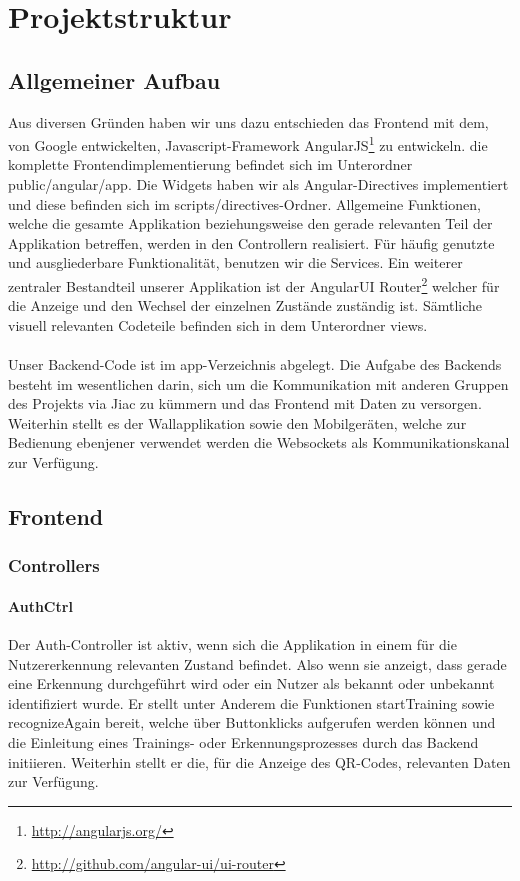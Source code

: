 \documentclass[10pt,a4paper]{report}
\newcommand{\code}[1]{{\fontfamily{cmvtt}\selectfont #1}}
\begin{document}
	\section{Projektstruktur}
		\subsection{Allgemeiner Aufbau}
			Aus diversen Gründen haben wir uns dazu entschieden das Frontend mit dem, von Google entwickelten, Javascript-Framework AngularJS\footnote{\href{http://angularjs.org/}{http://angularjs.org/}} zu entwickeln. die komplette Frontendimplementierung befindet sich im Unterordner \code{public/angular/app}. Die Widgets haben wir als Angular-Directives implementiert und diese befinden sich im \code{scripts/directives}-Ordner. Allgemeine Funktionen, welche die gesamte Applikation beziehungsweise den gerade relevanten Teil der Applikation betreffen, werden in den Controllern realisiert. Für häufig genutzte und ausgliederbare Funktionalität, benutzen wir die Services. Ein weiterer zentraler Bestandteil unserer Applikation ist der AngularUI Router\footnote{\href{http://github.com/angular-ui/ui-router}{http://github.com/angular-ui/ui-router}} welcher für die Anzeige und den Wechsel der einzelnen Zustände zuständig ist. Sämtliche visuell relevanten Codeteile befinden sich in dem Unterordner \code{views}.\\\\
			Unser Backend-Code ist im \code{app}-Verzeichnis abgelegt. Die Aufgabe des Backends  besteht im wesentlichen darin, sich um die Kommunikation mit anderen Gruppen des Projekts via Jiac zu kümmern und das Frontend mit Daten zu versorgen. Weiterhin stellt es der Wallapplikation sowie den Mobilgeräten, welche zur Bedienung ebenjener verwendet werden die Websockets als Kommunikationskanal zur Verfügung.

		\subsection{Frontend}
			\subsubsection{Controllers}
				\paragraph{AuthCtrl}
					Der Auth-Controller ist aktiv, wenn sich die Applikation in einem für die Nutzererkennung relevanten Zustand befindet. Also wenn sie anzeigt, dass gerade eine Erkennung durchgeführt wird oder ein Nutzer als bekannt oder unbekannt identifiziert wurde. Er stellt unter Anderem die Funktionen \code{startTraining} sowie \code{recognizeAgain} bereit, welche über Buttonklicks aufgerufen werden können und die Einleitung eines Trainings- oder Erkennungsprozesses durch das Backend initiieren. Weiterhin stellt er die, für die Anzeige des QR-Codes, relevanten Daten zur Verfügung.
\end{document}
